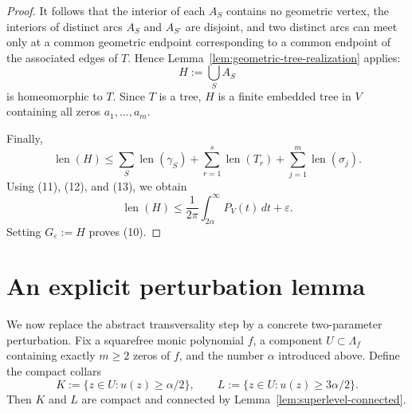 \documentclass[12pt]{amsart}
\theoremstyle{definition}
\theoremstyle{remark}
\begin{document}
\begin{proof}
It follows that the interior of each $A_S$ contains no geometric vertex, the interiors of distinct arcs $A_S$ and $A_{S'}$ are disjoint, and two distinct arcs can meet only at a common geometric endpoint corresponding to a common endpoint of the associated edges of $T$. Hence Lemma~\ref{lem:geometric-tree-realization} applies:
\[
 H:=\bigcup_S A_S
\]
is homeomorphic to $T$. Since $T$ is a tree, $H$ is a finite embedded tree in $V$ containing all zeros
$a_1,\dots,a_m$.

\indent Finally,
\[
\operatorname{len}(H)\le \sum_S \operatorname{len}(\gamma_S)+\sum_{r=1}^s \operatorname{len}(T_r)+\sum_{j=1}^m \operatorname{len}(\sigma_j).
\]
Using (11), (12), and (13), we obtain
\[
\operatorname{len}(H)\le \frac{1}{2\pi}\int_{2\alpha}^{\infty} P_V(t)\,dt+\varepsilon.
\]
Setting $G_\varepsilon:=H$ proves (10). \end{proof}

\section{An explicit perturbation lemma}

We now replace the abstract transversality step by a concrete two-parameter perturbation. Fix a
squarefree monic polynomial $f$, a component $U\subset \Lambda_f$ containing exactly $m\ge 2$ zeros of $f$, and the
number $\alpha$ introduced above. Define the compact collars
\[
K:=\{z\in U:u(z)\ge \alpha/2\},\qquad L:=\{z\in U:u(z)\ge 3\alpha/2\}.
\]
Then $K$ and $L$ are compact and connected by Lemma~\ref{lem:superlevel-connected}.
\end{document}
